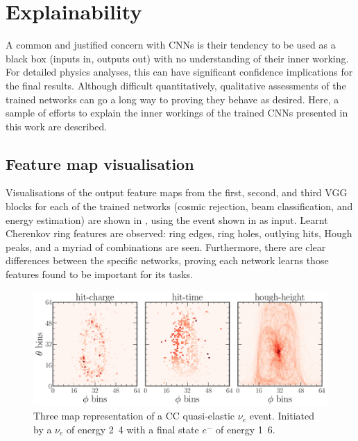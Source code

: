\section{Explainability} %
\label{sec:results_explain} %

A common and justified concern with CNNs is their tendency to be used as a black box (inputs in,
outputs out) with no understanding of their inner working. For detailed physics analyses, this can
have significant confidence implications for the final results. Although difficult quantitatively,
qualitative assessments of the trained networks can go a long way to proving they behave as
desired. Here, a sample of efforts to explain the inner workings of the trained CNNs presented in
this work are described.

\subsection{Feature map visualisation} %
\label{sec:results_explain_vis} %

Visualisations of the output feature maps from the first, second, and third VGG blocks for each of
the trained networks (cosmic rejection, beam classification, and energy estimation) are shown in
, using the event shown in 
as input. Learnt Cherenkov ring features are observed: ring edges, ring holes, outlying hits,
Hough peaks, and a myriad of combinations are seen. Furthermore, there are clear differences
between the specific networks, proving each network learns those features found to be important
for its tasks.

\begin{figure} %
    \includegraphics[width=\textwidth]{diagrams/7-results/explain_example_event.pdf}
    \caption[Example CC quasi-elastic $\nu_{e}$ event for explainability]
    {Three map representation of a CC quasi-elastic $\nu_{e}$ event. Initiated by a $\nu_{e}$ of
        energy \unit{2.4}{\GeV} with a final state $e^{-}$ of energy \unit{1.6}{\GeV}.}
    \label{fig:explain_example_event}
\end{figure}

